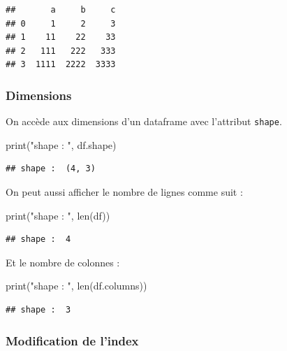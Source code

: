 \documentclass[
  12pt,
]{book}
\newenvironment{Shaded}{\begin{snugshade}}{\end{snugshade}}
\newcommand{\BuiltInTok}[1]{#1}
\newcommand{\NormalTok}[1]{#1}
\newcommand{\StringTok}[1]{\textcolor[rgb]{0.31,0.60,0.02}{#1}}
\numberwithin{equation}{section}
\numberwithin{countremarque}{section}
\begin{document}
\begin{lstlisting}
##       a     b     c
## 0     1     2     3
## 1    11    22    33
## 2   111   222   333
## 3  1111  2222  3333
\end{lstlisting}

\subsubsection{Dimensions}\label{dimensions-1}

On accède aux dimensions d'un dataframe avec l'attribut \texttt{shape}.

\begin{Shaded}
\begin{Highlighting}[]
\BuiltInTok{print}\NormalTok{(}\StringTok{"shape : "}\NormalTok{, df.shape)}
\end{Highlighting}
\end{Shaded}

\begin{lstlisting}
## shape :  (4, 3)
\end{lstlisting}

On peut aussi afficher le nombre de lignes comme suit :

\begin{Shaded}
\begin{Highlighting}[]
\BuiltInTok{print}\NormalTok{(}\StringTok{"shape : "}\NormalTok{, }\BuiltInTok{len}\NormalTok{(df))}
\end{Highlighting}
\end{Shaded}

\begin{lstlisting}
## shape :  4
\end{lstlisting}

Et le nombre de colonnes :

\begin{Shaded}
\begin{Highlighting}[]
\BuiltInTok{print}\NormalTok{(}\StringTok{"shape : "}\NormalTok{, }\BuiltInTok{len}\NormalTok{(df.columns))}
\end{Highlighting}
\end{Shaded}

\begin{lstlisting}
## shape :  3
\end{lstlisting}

\subsubsection{Modification de l'index}\label{modification-de-lindex}
\end{document}
